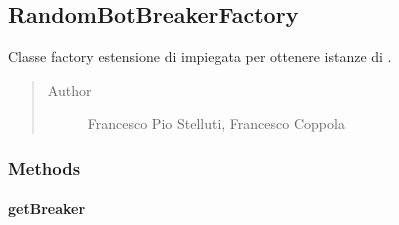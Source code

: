 \documentclass[letterpaper,10pt,italian,openany,oneside]{sphinxmanual}
\begin{document}
\subsection{RandomBotBreakerFactory}
\label{\detokenize{source/it/unicam/cs/pa/mastermind/factories/RandomBotBreakerFactory:randombotbreakerfactory}}\label{\detokenize{source/it/unicam/cs/pa/mastermind/factories/RandomBotBreakerFactory::doc}}

\begin{fulllineitems}
\label{\detokenize{source/it/unicam/cs/pa/mastermind/factories/RandomBotBreakerFactory:it.unicam.cs.pa.mastermind.factories.RandomBotBreakerFactory}}
Classe factory estensione di  impiegata per ottenere istanze di .
\begin{quote}\begin{description}
\item[{Author}] \leavevmode
Francesco Pio Stelluti, Francesco Coppola

\end{description}\end{quote}

\end{fulllineitems}



\subsubsection{Methods}
\label{\detokenize{source/it/unicam/cs/pa/mastermind/factories/RandomBotBreakerFactory:methods}}

\paragraph{getBreaker}
\label{\detokenize{source/it/unicam/cs/pa/mastermind/factories/RandomBotBreakerFactory:getbreaker}}

\begin{fulllineitems}
\label{\detokenize{source/it/unicam/cs/pa/mastermind/factories/RandomBotBreakerFactory:it.unicam.cs.pa.mastermind.factories.RandomBotBreakerFactory.getBreaker()}}
\end{fulllineitems}
\end{document}
